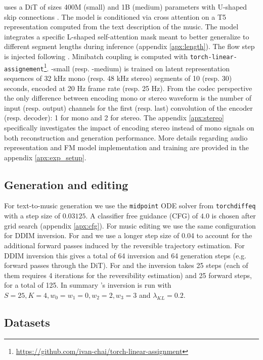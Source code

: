\proposed uses a DiT of sizes 400M (small) and 1B (medium) parameters with U-shaped skip connections \cite{Bao_2023_CVPR}.
The model is conditioned via cross attention on a T5 representation \citep{JMLR:v21:20-074} computed from the text description of the music.
The model integrates a specific L-shaped self-attention mask meant to better generalize to different segment lengths during inference (appendix \ref{apx:length}).
The flow step is injected following \citet{hatamizadeh2023diffit}. Minibatch coupling is computed with \verb+torch-linear-assignement+\footnote{\url{https://github.com/ivan-chai/torch-linear-assignment}}.
\proposed-small (resp. \proposed-medium) is trained on latent representation sequences of 32 kHz mono (resp. 48 kHz stereo) segments of 10 (resp. 30) seconds, encoded at 20 Hz frame rate (resp. 25 Hz).
From the codec perspective the only difference between encoding mono or stereo waveform is the number of input (resp. output) channels for the first (resp. last) convolution of the encoder (resp. decoder): 1 for mono and 2 for stereo.
The appendix \ref{apx:stereo} specifically investigates the impact of encoding stereo instead of mono signals on both reconstruction and generation performance.
More details regarding audio representation and FM model implementation and training are provided in the appendix \ref{apx:exp_setup}.

\subsection{Generation and editing}
For text-to-music generation we use the \verb+midpoint+ ODE solver from \verb+torchdiffeq+ with a step size of $0.03125$.
A classifier free guidance (CFG) of $4.0$ is chosen after grid search (appendix \ref{apx:cfg}).
For music editing we use the same configuration for DDIM inversion. For \renoise and \proposed we use a longer step size of 0.04 to account for the additional forward passes induced by the reversible trajectory estimation.
For DDIM inversion this gives a total of 64 inversion and 64 generation steps (e.g. forward passes through the DiT).
For \renoise and \proposed the inversion takes 25 steps (each of them requires 4 iterations for the reversibility estimation) and 25 forward steps, for a total of 125.
In summary \proposed's inversion is run with $S=25,K=4,w_0=w_1=0,w_2=2,w_3=3$ and $\lambda_{KL}=0.2$.

\subsection{Datasets}
